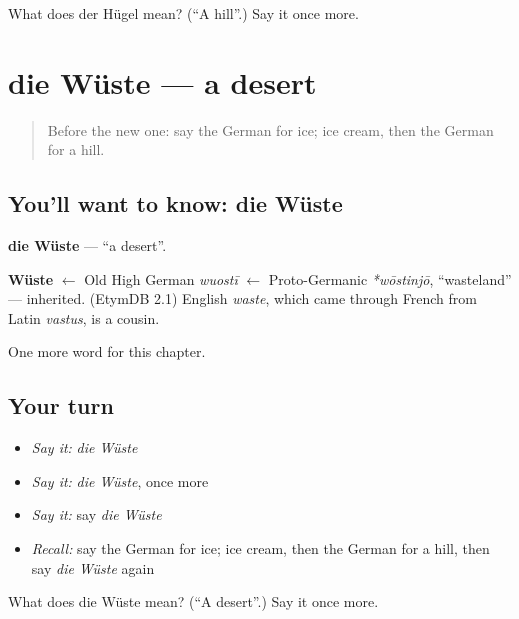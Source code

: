 \begin{tcolorbox}[breakable,colback=teal!4,colframe=teal!35!black,title={Before you move on}]
What does der Hügel mean? (\textquotedblleft{}A hill\textquotedblright{}.) Say it once more.
\end{tcolorbox}
\section[die Wüste]{die Wüste — a desert}

\label{lesson:GE-C85-wueste}



\begin{quote}
Before the new one: say the German for ice; ice cream, then the German for a hill.
\end{quote}

\subsection*{You'll want to know: die Wüste}
\textbf{die Wüste} — \textquotedblleft{}a desert\textquotedblright{}.

\begin{cousinweb}
\textbf{Wüste} $\leftarrow$ Old High German \emph{wuostī} $\leftarrow$ Proto-Germanic \emph{*wōstinjō}, \textquotedblleft{}wasteland\textquotedblright{} — inherited. (EtymDB 2.1) English \emph{waste}, which came through French from Latin \emph{vastus}, is a cousin.
\end{cousinweb}

\begin{grammarlens}[title={What you've built}]
One more word for this chapter.
\end{grammarlens}

\subsection*{Your turn}
\begin{itemize}
\raggedright
  \item \emph{Say it:} \emph{die Wüste}
  \item \emph{Say it:} \emph{die Wüste}, once more
  \item \emph{Say it:} say \emph{die Wüste}
  \item \emph{Recall:} say the German for ice; ice cream, then the German for a hill, then say \emph{die Wüste} again
\end{itemize}

\begin{tcolorbox}[breakable,colback=teal!4,colframe=teal!35!black,title={Before you move on}]
What does die Wüste mean? (\textquotedblleft{}A desert\textquotedblright{}.) Say it once more.
\end{tcolorbox}
